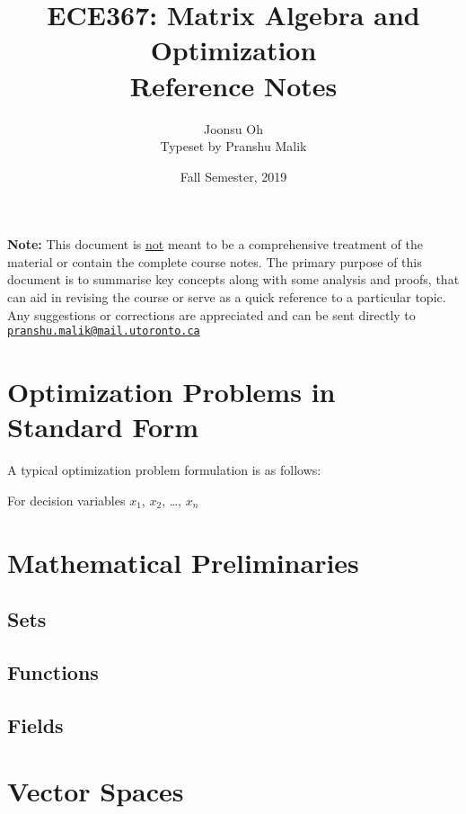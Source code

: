 \documentclass[10pt]{article}
\date{Fall Semester, 2019}
\begin{document}
\title{\textbf{\Large{\textsc{ECE367:} Matrix Algebra and Optimization}} \\ \Large{Reference Notes}\vspace{-0.3cm}}
\author{Joonsu Oh\\\footnotesize Typeset by Pranshu Malik}

\maketitle
\tableofcontents
\blfootnote
{
    \textbf{Note:} This document is \underline{not} meant to be a comprehensive treatment of the material 
    or contain the complete course notes. The primary purpose of this document is to summarise key concepts along with some analysis and proofs, that can aid in revising the course or serve as a quick reference to a particular topic. Any suggestions or corrections are appreciated and can be
    sent directly to \texttt{\href{mailto:pranshu.malik@mail.utoronto.ca}{pranshu.malik@mail.utoronto.ca}}
}

\pagebreak

\section{Optimization Problems in Standard Form}

A typical optimization problem formulation is as follows:\\

\begin{defn}{}
    For decision variables $x_1$, $x_2$, \ldots, $x_n$
\end{defn}

\section{Mathematical Preliminaries}

\subsection{Sets}
\subsection{Functions}
\subsection{Fields}

\section{Vector Spaces}
\end{document}
